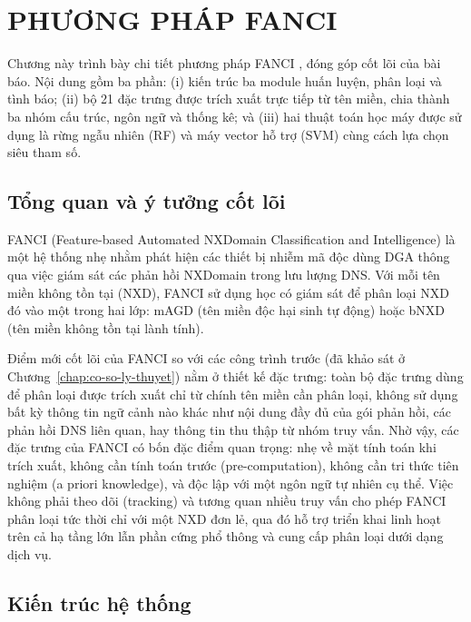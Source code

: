 \section{PHƯƠNG PHÁP FANCI}\label{chap:fanci}

Chương này trình bày chi tiết phương pháp FANCI \cite{schuppen2018fanci}, đóng góp cốt lõi của bài báo. Nội dung gồm ba phần: (i) kiến trúc ba module huấn luyện, phân loại và tình báo; (ii) bộ 21 đặc trưng được trích xuất trực tiếp từ tên miền, chia thành ba nhóm cấu trúc, ngôn ngữ và thống kê; và (iii) hai thuật toán học máy được sử dụng là rừng ngẫu nhiên (RF) và máy vector hỗ trợ (SVM) cùng cách lựa chọn siêu tham số.

\subsection{Tổng quan và ý tưởng cốt lõi}\label{sec:tong-quan-fanci}

FANCI (Feature-based Automated NXDomain Classification and Intelligence) là một hệ thống nhẹ nhằm phát hiện các thiết bị nhiễm mã độc dùng DGA thông qua việc giám sát các phản hồi NXDomain trong lưu lượng DNS. Với mỗi tên miền không tồn tại (NXD), FANCI sử dụng học có giám sát để phân loại NXD đó vào một trong hai lớp: mAGD (tên miền độc hại sinh tự động) hoặc bNXD (tên miền không tồn tại lành tính).

Điểm mới cốt lõi của FANCI so với các công trình trước (đã khảo sát ở Chương~\ref{chap:co-so-ly-thuyet}) nằm ở thiết kế đặc trưng: toàn bộ đặc trưng dùng để phân loại được trích xuất chỉ từ chính tên miền cần phân loại, không sử dụng bất kỳ thông tin ngữ cảnh nào khác như nội dung đầy đủ của gói phản hồi, các phản hồi DNS liên quan, hay thông tin thu thập từ nhóm truy vấn. Nhờ vậy, các đặc trưng của FANCI có bốn đặc điểm quan trọng: nhẹ về mặt tính toán khi trích xuất, không cần tính toán trước (pre-computation), không cần tri thức tiên nghiệm (a priori knowledge), và độc lập với một ngôn ngữ tự nhiên cụ thể. Việc không phải theo dõi (tracking) và tương quan nhiều truy vấn cho phép FANCI phân loại tức thời chỉ với một NXD đơn lẻ, qua đó hỗ trợ triển khai linh hoạt trên cả hạ tầng lớn lẫn phần cứng phổ thông và cung cấp phân loại dưới dạng dịch vụ.

\subsection{Kiến trúc hệ thống}\label{sec:kien-truc}

